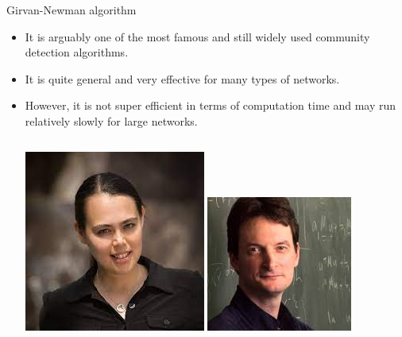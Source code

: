 \documentclass[
    hyperref={colorlinks,linkcolor=blue,urlcolor=blue,citecolor=blue}
]{beamer}
\begin{document}
\begin{frame}{Girvan-Newman algorithm}
\begin{itemize}
    \item<2-> It is arguably one of the most famous and still widely used
    community detection algorithms.
    \item<3-> It is quite general and very effective for many types of networks.
    \item<4-> However, it is not super efficient in terms of computation time
    and may run relatively slowly for large networks.
    \pause
    \vspace{1em}
    \begin{columns}
        \centering
        \includegraphics[width=.6\textwidth]{girvan}
        \centering
        \includegraphics[width=.65\textwidth]{newman}
    \end{columns}
\end{itemize}
\end{frame}
\end{document}
